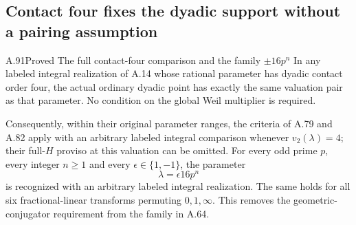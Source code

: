 \subsection{Contact four fixes the dyadic support without a pairing assumption}

\begin{statement}{A.91}{Proved}
{The full contact-four comparison and the family $\pm16p^n$}
In any labeled integral realization of A.14 whose rational
parameter has dyadic contact order four, the actual ordinary
dyadic point has exactly the same valuation pair as that
parameter.  No condition on the global Weil multiplier
is required.

Consequently, within their original parameter ranges, the criteria of A.79 and A.82 apply with an
arbitrary labeled integral comparison whenever
$v_2(\lambda)=4$; their full-$H$ proviso at this valuation
can be omitted.
For every odd prime $p$, every integer $n\ge1$ and every
$\epsilon\in\{1,-1\}$, the parameter
\[
                             \lambda=\epsilon16p^n
\tag{A.91.1}
\]
is recognized with an arbitrary labeled integral realization.
The same holds for all six fractional-linear transforms
permuting $0,1,\infty$.  This removes the geometric-conjugator
requirement from the family in A.64.
\end{statement}
